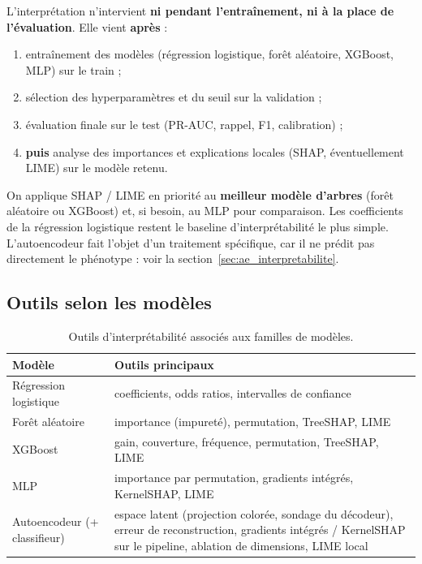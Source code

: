 \documentclass[11pt,a4paper]{article}
\begin{document}
L'interprétation n'intervient \textbf{ni pendant l'entraînement, ni à la place de l'évaluation}. Elle vient \textbf{après} :
\begin{enumerate}[leftmargin=1.4em]
    \item entraînement des modèles (régression logistique, forêt aléatoire, XGBoost, MLP) sur le train ;
    \item sélection des hyperparamètres et du seuil sur la validation ;
    \item évaluation finale sur le test (PR-AUC, rappel, F1, calibration) ;
    \item \textbf{puis} analyse des importances et explications locales (SHAP, éventuellement LIME) sur le modèle retenu.
\end{enumerate}

On applique SHAP / LIME en priorité au \textbf{meilleur modèle d'arbres} (forêt aléatoire ou XGBoost) et, si besoin, au MLP pour comparaison. Les coefficients de la régression logistique restent le baseline d'interprétabilité le plus simple. L'autoencodeur fait l'objet d'un traitement spécifique, car il ne prédit pas directement le phénotype : voir la section~\ref{sec:ae_interpretabilite}.

\subsection{Outils selon les modèles}

\begin{table}[H]
\centering
\caption{Outils d'interprétabilité associés aux familles de modèles.}
\label{tab:interpretability}
\begin{tabularx}{\textwidth}{lX}
\toprule
\textbf{Modèle} & \textbf{Outils principaux} \\
\midrule
Régression logistique & coefficients, odds ratios, intervalles de confiance \\
Forêt aléatoire & importance (impureté), permutation, TreeSHAP, LIME \\
XGBoost & gain, couverture, fréquence, permutation, TreeSHAP, LIME \\
MLP & importance par permutation, gradients intégrés, KernelSHAP, LIME \\
Autoencodeur (+ classifieur) & espace latent (projection colorée, sondage du décodeur), erreur de reconstruction, gradients intégrés / KernelSHAP sur le pipeline, ablation de dimensions, LIME local \\
\bottomrule
\end{tabularx}
\end{table}
\end{document}
